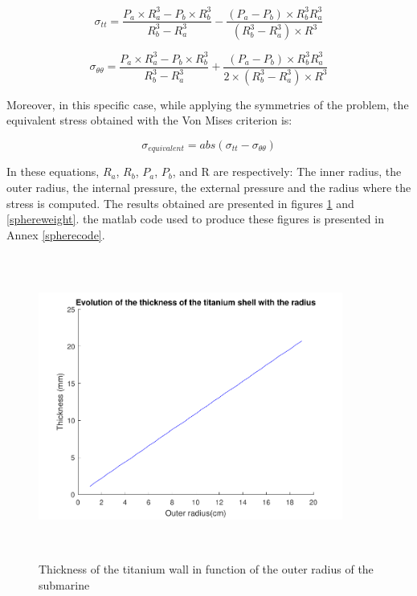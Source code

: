\begin{equation}
\sigma_{tt}=\frac{P_{a}\times R_{a}^{3}-P_{b}\times R_{b}^{3}}{R_{b}^{3}-R_{a}^{3}}-\frac{(P_{a}-P_{b}) \times R_{b}^{3} R_{a}^{3}}{(R_{b}^{3}-R_{a}^{3}) \times R^{3}}
\end{equation}

\begin{equation}
\sigma_{\theta\theta}=\frac{P_{a}\times R_{a}^{3}-P_{b}\times R_{b}^{3}}{R_{b}^{3}-R_{a}^{3}}+\frac{(P_{a}-P_{b}) \times R_{b}^{3} R_{a}^{3}}{2 \times (R_{b}^{3}-R_{a}^{3}) \times R^{3}}
\end{equation}

Moreover, in this specific case, while applying the symmetries of the problem, the equivalent stress obtained with the Von Mises criterion is:

\begin{equation}
\sigma_{equivalent}= abs(\sigma_{tt}-\sigma_{\theta\theta})
\end{equation}

In these equations, $R_{a}$, $R_{b}$, $P_{a}$, $P_{b}$, and R are respectively: The inner radius, the outer radius, the internal pressure, the external pressure and the radius where the stress is computed. The results obtained are presented in figures \ref{wallthickness} and \ref{sphereweight}. the matlab code used to produce these figures is presented in Annex \ref{spherecode}.


\begin{figure}[H]
\centering
\includegraphics[width=10cm, height=10cm, clip]{figures/Paul/Thickness.pdf}
\caption{Thickness of the titanium wall in function of the outer radius of the submarine}
\label{wallthickness}
\end{figure}

